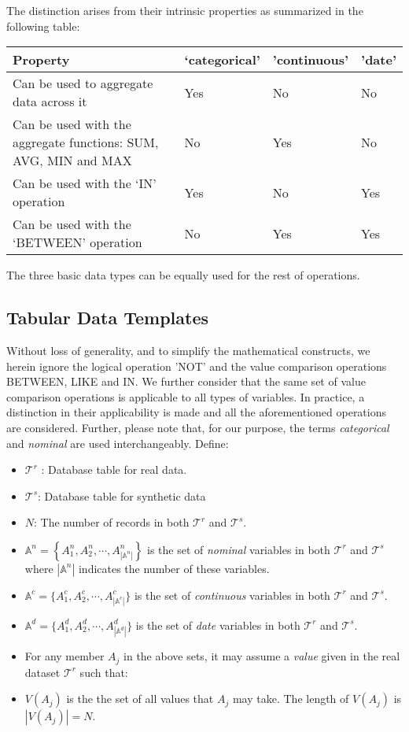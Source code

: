 The distinction arises from their intrinsic properties as summarized in
the following table:

\begin{longtable}[]{@{}llll@{}}
\toprule
Property & `categorical' & 'continuous' & 'date'\tabularnewline
\midrule
\endhead
Can be used to aggregate data across it & Yes & No & No\tabularnewline
Can be used with the aggregate functions: SUM, AVG, MIN and MAX & No &
Yes & No\tabularnewline
Can be used with the `IN' operation & Yes & No & Yes\tabularnewline
Can be used with the `BETWEEN' operation & No & Yes & Yes\tabularnewline
\bottomrule
\end{longtable}

The three basic data types can be equally used for the rest of
operations.

\hypertarget{tabular-data-templates-1}{%
\subsection{Tabular Data Templates}\label{tabular-data-templates-1}}

Without loss of generality, and to simplify the mathematical constructs,
we herein ignore the logical operation 'NOT' and the value comparison
operations BETWEEN, LIKE and IN. We further consider that the same set
of value comparison operations is applicable to all types of variables.
In practice, a distinction in their applicability is made and all the
aforementioned operations are considered. Further, please note that, for
our purpose, the terms \emph{categorical} and \emph{nominal} are used
interchangeably. Define:

\begin{itemize}
\item
  \(\mathcal{T}^{r}\) : Database table for real data.
\item
  \(\mathcal{T}^{s}\): Database table for synthetic data
\item
  \(N\): The number of records in both \(\mathcal{T}^{r}\) and
  \(\mathcal{T}^{s}\).
\item
  \(\mathbb{A}^{n} = \left\{ A_{1}^{n},A_{2}^{n},\cdots,A_{\left| \mathbb{A}^{n} \right|}^{n} \right\}\)
  is the set of \emph{nominal} variables in both \(\mathcal{T}^{r}\) and
  \(\mathcal{T}^{s}\) where \(|\mathbb{A}^{n}|\) indicates the number of
  these variables.
\item
  \(\mathbb{A}^{c} = \{ A_{1}^{c},A_{2}^{c},\cdots,A_{|\mathbb{A}^{c}|}^{c}\}\)
  is the set of \emph{continuous} variables in both \(\mathcal{T}^{r}\)
  and \(\mathcal{T}^{s}\).
\item
  \(\mathbb{A}^{d} = \{ A_{1}^{d},A_{2}^{d},\cdots,A_{|\mathbb{A}^{d}|}^{d}\}\)
  is the set of \emph{date} variables in both \(\mathcal{T}^{r}\) and
  \(\mathcal{T}^{s}\).
\item
  For any member \(A_{j}\) in the above sets, it may assume a
  \emph{value} given in the real dataset \(\mathcal{T}^{r}\) such that:
\item
  \(V(A_{j})\) is the the set of all values that \(A_{j}\) may take. The
  length of \(V(A_{j})\) is \(|V(A_{j})| = N\).
\end{itemize}

